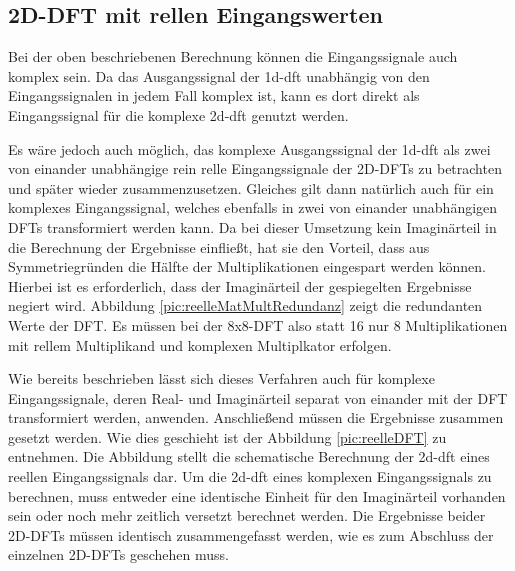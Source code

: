 \subsection{2D-DFT mit rellen Eingangswerten}\label{sec:rein_reelle_dft}
Bei der oben beschriebenen Berechnung können die Eingangssignale auch komplex sein. Da das Ausgangssignal der \gls{1d-dft} unabhängig von den Eingangssignalen in jedem Fall 
komplex ist, kann es dort direkt als Eingangssignal für die komplexe \gls{2d-dft} genutzt werden. 

Es wäre jedoch auch möglich, das komplexe Ausgangssignal der \gls{1d-dft} als zwei von einander unabhängige rein relle Eingangssignale der 2D-DFTs zu betrachten und später 
wieder zusammenzusetzen. Gleiches gilt dann natürlich auch für ein komplexes Eingangssignal, welches ebenfalls in zwei von einander unabhängigen DFTs transformiert werden kann.
Da bei dieser Umsetzung kein Imaginärteil in die Berechnung der Ergebnisse einfließt, hat sie den Vorteil, dass aus Symmetriegründen die Hälfte der Multiplikationen 
eingespart werden können. Hierbei ist es erforderlich, dass der Imaginärteil der gespiegelten Ergebnisse negiert wird. Abbildung \ref{pic:reelleMatMultRedundanz} zeigt die 
redundanten Werte der DFT. Es müssen bei der 8x8-DFT also statt 16 nur 8 Multiplikationen mit rellem Multiplikand und komplexen Multiplkator erfolgen.

Wie bereits beschrieben lässt sich dieses Verfahren auch für komplexe Eingangssignale, deren Real- und Imaginärteil separat von einander mit der DFT transformiert werden, anwenden.
Anschließend müssen die Ergebnisse zusammen gesetzt werden. Wie dies geschieht ist der Abbildung \ref{pic:reelleDFT} zu entnehmen.
Die Abbildung stellt die schematische Berechnung der \gls{2d-dft} eines reellen Eingangssignals dar. 
Um die \gls{2d-dft} eines komplexen Eingangssignals zu berechnen, muss entweder eine identische Einheit für den Imaginärteil vorhanden sein oder noch mehr zeitlich versetzt 
berechnet werden. Die Ergebnisse beider 2D-DFTs müssen identisch zusammengefasst werden, wie es zum Abschluss der einzelnen 2D-DFTs geschehen muss.

